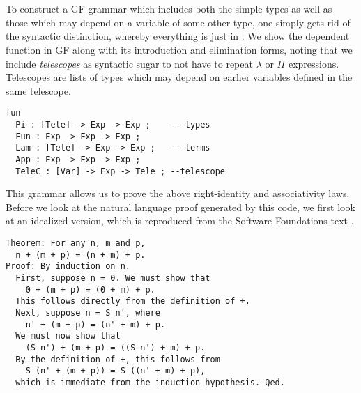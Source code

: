 \begin{code}
\AgdaSymbol{(}\AgdaSpace{}%
\AgdaOperator{\AgdaFunction{+}}\AgdaSpace{}%
\AgdaSymbol{))}\<%
\\
\>[0]\AgdaSpace{}%
\AgdaSpace{}%
\AgdaSpace{}%
\AgdaSpace{}%
\AgdaSymbol{=}\AgdaSpace{}%
\<%
\\
\>[0]\AgdaSpace{}%
\AgdaSymbol{(}\AgdaSpace{}%
\AgdaSymbol{)}\AgdaSpace{}%
\AgdaSpace{}%
\AgdaSpace{}%
\AgdaSymbol{=}\AgdaSpace{}%
\AgdaSpace{}%
\AgdaSpace{}%
\AgdaSymbol{(}\AgdaSpace{}%
\AgdaSpace{}%
\AgdaSpace{}%
\AgdaSymbol{)}\<%
\end{code}

To construct a GF grammar which includes both the simple types as well as those
which may depend on a variable of some other type, one simply gets rid of the
syntactic distinction, whereby everything is just in . We show the
dependent function in GF along with its introduction and elimination forms, noting
that we include \emph{telescopes} as syntactic sugar to not have to repeat
$\lambda$ or $\Pi$ expressions. Telescopes are lists of types which may depend
on earlier variables defined in the same telescope.

\begin{verbatim}
fun
  Pi : [Tele] -> Exp -> Exp ;    -- types
  Fun : Exp -> Exp -> Exp ;
  Lam : [Tele] -> Exp -> Exp ;   -- terms
  App : Exp -> Exp -> Exp ;
  TeleC : [Var] -> Exp -> Tele ; --telescope
\end{verbatim}

This grammar allows us to prove the above right-identity and associativity laws.
Before we look at the natural language proof generated by this code, we first
look at an idealized version, which is reproduced from the Software Foundations text
\cite{pierce2010software}.

\begin{verbatim}
Theorem: For any n, m and p,
  n + (m + p) = (n + m) + p.
Proof: By induction on n.
  First, suppose n = 0. We must show that
    0 + (m + p) = (0 + m) + p.
  This follows directly from the definition of +.
  Next, suppose n = S n', where
    n' + (m + p) = (n' + m) + p.
  We must now show that
    (S n') + (m + p) = ((S n') + m) + p.
  By the definition of +, this follows from
    S (n' + (m + p)) = S ((n' + m) + p),
  which is immediate from the induction hypothesis. Qed.
\end{verbatim}

